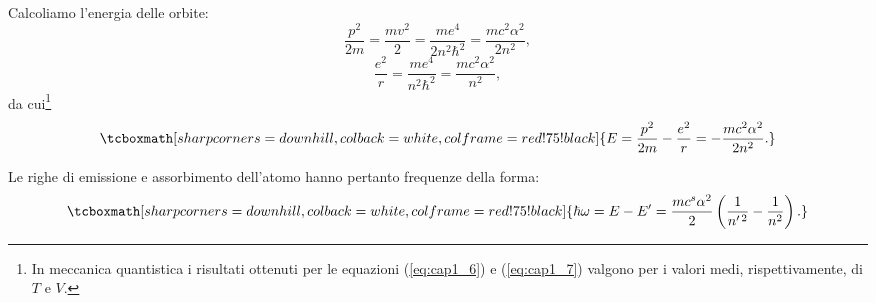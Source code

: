 	
Calcoliamo l'energia delle orbite:
	\begin{equation}
		\frac{p^2}{2m}= \frac{mv^2}{2} =\frac{me^4}{2n^2 \hbar ^2} =\frac{mc^2 \alpha ^2}{2n^2},
		\label{eq:cap1_6}
	\end{equation}
	\begin{equation}
		\frac{e^2}{r}= \frac{me^4}{n^2 \hbar^2} =\frac{mc^2 \alpha ^2}{n^2},
		\label{eq:cap1_7}
	\end{equation}
da cui\footnote{In meccanica quantistica i risultati ottenuti per le equazioni (\ref{eq:cap1_6}) e (\ref{eq:cap1_7}) valgono per i valori medi, rispettivamente, di $T$ e $V$.}
	\begin{equation}
		\tcboxmath[sharp corners=downhill ,colback=white,colframe=red!75!black]{
			E=\frac{p^2}{2m}-\frac{e^2}{r}=-\frac{mc^2\alpha ^2}{2n^2}. }
	\end{equation}
	
Le righe di emissione e assorbimento dell'atomo hanno pertanto frequenze della forma:
	\begin{equation}
		\tcboxmath[sharp corners=downhill ,colback=white,colframe=red!75!black]{
			\hbar \omega = E-E' =\frac{mc^s \alpha ^2}{2}\left(\frac{1}{n^{\prime \, 2}} - \frac{1}{n^2}\right).
			}
	\end{equation}
